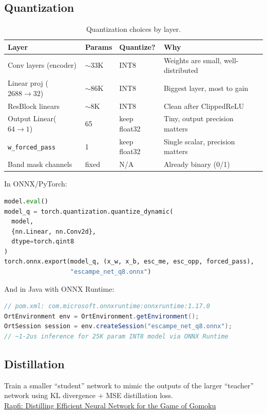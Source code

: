 \documentclass[11pt,a4paper]{article}
\begin{document}
\subsection{Quantization}
\begin{table}[htbp]
  \centering
  \caption{Quantization choices by layer.}
  \label{tab:quantization-choices}
  \begin{tabular}{L{0.30\textwidth} L{0.12\textwidth} L{0.16\textwidth} L{0.30\textwidth}}
    \toprule
    Layer & Params & Quantize? & Why \\
    \midrule
    Conv layers (encoder) & $\sim$33K & INT8 & Weights are small, well-distributed \\
    Linear proj ($2688\to32$) & $\sim$86K & INT8 & Biggest layer, most to gain \\
    ResBlock linears & $\sim$8K & INT8 & Clean after ClippedReLU \\
    Output Linear($64\to1$) & 65 & keep float32 & Tiny, output precision matters \\
    \texttt{w\_forced\_pass} & 1 & keep float32 & Single scalar, precision matters \\
    Band mask channels & fixed & N/A & Already binary (0/1) \\
    \bottomrule
  \end{tabular}
\end{table}

In ONNX/PyTorch:
\begin{lstlisting}[language=Python]
model.eval()
model_q = torch.quantization.quantize_dynamic(
  model,
  {nn.Linear, nn.Conv2d},
  dtype=torch.qint8
)
torch.onnx.export(model_q, (x_w, x_b, esc_me, esc_opp, forced_pass),
                  "escampe_net_q8.onnx")
\end{lstlisting}

And in Java with ONNX Runtime:
\begin{lstlisting}[language=Java]
// pom.xml: com.microsoft.onnxruntime:onnxruntime:1.17.0
OrtEnvironment env = OrtEnvironment.getEnvironment();
OrtSession session = env.createSession("escampe_net_q8.onnx");
// ~1-2us inference for 25K param INT8 model via ONNX Runtime
\end{lstlisting}

\subsection{Distillation}
Train a smaller ``student'' network to mimic the outputs of the larger ``teacher'' network using KL divergence + MSE distillation loss.\\
\href{https://arxiv.org/html/2503.13178}{Rapfi: Distilling Efficient Neural Network for the Game of Gomoku}
\end{document}
